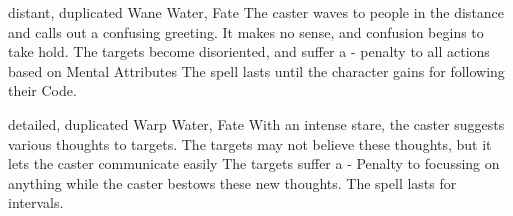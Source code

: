 \ifodd\value{diceNo}

  {distant, duplicated}%
  {Wane}%
  {Water, Fate}%
  {}%
  {
    The caster waves to people in the distance and calls out a confusing greeting.
    It makes no sense, and confusion begins to take hold.
    The targets become disoriented, and suffer a - penalty to all actions based on Mental Attributes}%
  {
    The spell lasts until the character gains  for following their Code.
  }

\else

  {detailed, duplicated}%
  {Warp}%
  {Water, Fate}%
  {}%
  {With an intense stare, the caster suggests various thoughts to  targets.
  The targets may not believe these thoughts, but it lets the caster communicate easily}%
  {The targets suffer a - Penalty to focussing on anything while the caster bestows these new thoughts.
  The spell lasts for  \glspl{interval}.}

\fi
